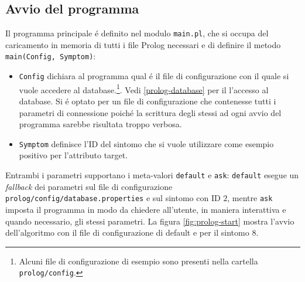\documentclass[preprint]{acm_proc_article-sp}
\begin{document}
\subsection{Avvio del programma}
\label{prolog-main}
Il programma principale \'e definito nel modulo \verb|main.pl|, che si occupa del caricamento in memoria di tutti i file Prolog necessari e di definire il metodo \verb|main(Config, Symptom)|:
\begin{itemize}
\item \verb|Config| dichiara al programma qual \'e il file di configurazione con il quale si vuole accedere al database.\footnote{Alcuni file di configurazione di esempio sono presenti nella cartella \texttt{prolog/config}.}. Vedi \ref{prolog-database} per il l'accesso al database. Si \'e optato per un file di configurazione che contenesse tutti i parametri di connessione poich\'e la scrittura degli stessi ad ogni avvio del programma sarebbe risultata troppo verbosa.
\item \verb|Symptom| definisce l'ID del sintomo che si vuole utilizzare come esempio positivo per l'attributo target.
\end{itemize}


Entrambi i parametri supportano i meta-valori \verb|default| e \verb|ask|: \verb|default| esegue un \textit{fallback} dei parametri sul file di configurazione \texttt{prolog/config/database.properties} e sul sintomo con ID $2$, mentre \verb|ask| imposta il programma in modo da chiedere all'utente, in maniera interattiva e quando necessario, gli stessi parametri. La figura \ref{fig:prolog-start} mostra l'avvio dell'algoritmo con il file di configurazione di default e per il sintomo $8$.
\end{document}
